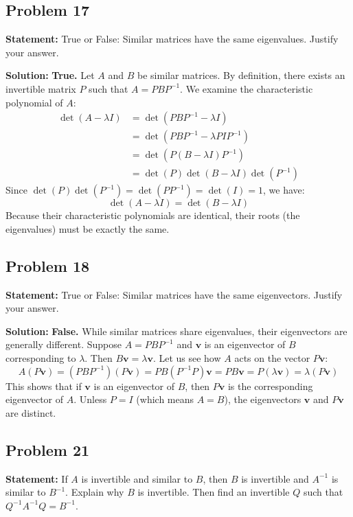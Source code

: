\documentclass[11pt, a4paper]{article}
\theoremstyle{definition}
\theoremstyle{remark}
\begin{document}
\subsection{Problem 17}
\textbf{Statement:} True or False: Similar matrices have the same eigenvalues. Justify your answer.

\textbf{Solution:}
\textbf{True.} Let $A$ and $B$ be similar matrices. By definition, there exists an invertible matrix $P$ such that $A = PBP^{-1}$. We examine the characteristic polynomial of $A$:
\begin{align*}
    \det(A - \lambda I) &= \det(PBP^{-1} - \lambda I) \\
    &= \det(PBP^{-1} - \lambda PIP^{-1}) \\
    &= \det(P(B - \lambda I)P^{-1}) \\
    &= \det(P) \det(B - \lambda I) \det(P^{-1})
\end{align*}
Since $\det(P)\det(P^{-1}) = \det(PP^{-1}) = \det(I) = 1$, we have:
\[
\det(A - \lambda I) = \det(B - \lambda I)
\]
Because their characteristic polynomials are identical, their roots (the eigenvalues) must be exactly the same.

\subsection{Problem 18}
\textbf{Statement:} True or False: Similar matrices have the same eigenvectors. Justify your answer.

\textbf{Solution:}
\textbf{False.} While similar matrices share eigenvalues, their eigenvectors are generally different. Suppose $A = PBP^{-1}$ and $\mathbf{v}$ is an eigenvector of $B$ corresponding to $\lambda$. Then $B\mathbf{v} = \lambda \mathbf{v}$.
Let us see how $A$ acts on the vector $P\mathbf{v}$:
\[
A(P\mathbf{v}) = (PBP^{-1})(P\mathbf{v}) = PB(P^{-1}P)\mathbf{v} = PB\mathbf{v} = P(\lambda \mathbf{v}) = \lambda(P\mathbf{v})
\]
This shows that if $\mathbf{v}$ is an eigenvector of $B$, then $P\mathbf{v}$ is the corresponding eigenvector of $A$. Unless $P = I$ (which means $A=B$), the eigenvectors $\mathbf{v}$ and $P\mathbf{v}$ are distinct.

\subsection{Problem 21}
\textbf{Statement:} If $A$ is invertible and similar to $B$, then $B$ is invertible and $A^{-1}$ is similar to $B^{-1}$. Explain why $B$ is invertible. Then find an invertible $Q$ such that $Q^{-1}A^{-1}Q = B^{-1}$.
\end{document}
